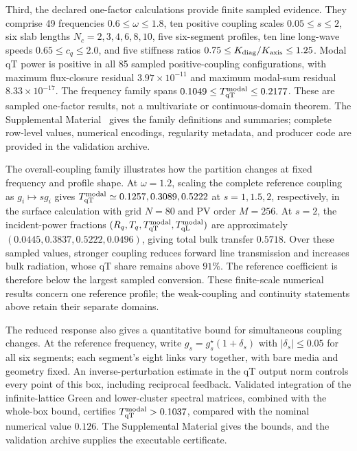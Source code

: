 \documentclass[10pt,aps,pre,reprint,floatfix,notitlepage,nofootinbib]{revtex4-2}
\newcommand{\qT}{\mathrm{qT}}
\newcommand{\qL}{\mathrm{qL}}
\begin{document}
Third, the declared one-factor calculations provide finite sampled evidence. They comprise 49 frequencies $0.6\leq\omega\leq1.8$, ten positive coupling scales $0.05\leq s\leq2$, six slab lengths $N_c=2,3,4,6,8,10$, five six-segment profiles, ten line long-wave speeds $0.65\leq c_q\leq2.0$, and five stiffness ratios $0.75\leq K_{\rm diag}/K_{\rm axis}\leq1.25$. Modal qT power is positive in all 85 sampled positive-coupling configurations, with maximum flux-closure residual $3.97\times10^{-11}$ and maximum modal-sum residual $8.33\times10^{-17}$. The frequency family spans $0.1049\leq T_{\qT}^{\rm modal}\leq0.2177$. These are sampled one-factor results, not a multivariate or continuous-domain theorem. The Supplemental Material~\cite{SupplementalMaterial} gives the family definitions and summaries; complete row-level values, numerical encodings, regularity metadata, and producer code are provided in the validation archive.

The overall-coupling family illustrates how the partition changes at fixed frequency and profile shape. At $\omega=1.2$, scaling the complete reference coupling as $g_i\mapsto s g_i$ gives $T_{\qT}^{\rm modal}\simeq0.1257,0.3089,0.5222$ at $s=1,1.5,2$, respectively, in the surface calculation with grid $N=80$ and PV order $M=256$. At $s=2$, the incident-power fractions $(R_q,T_q,T_{\qT}^{\rm modal},T_{\qL}^{\rm modal})$ are approximately $(0.0445,0.3837,0.5222,0.0496)$, giving total bulk transfer $0.5718$. Over these sampled values, stronger coupling reduces forward line transmission and increases bulk radiation, whose qT share remains above $91\%$. The reference coefficient is therefore below the largest sampled conversion. These finite-scale numerical results concern one reference profile; the weak-coupling and continuity statements above retain their separate domains.

The reduced response also gives a quantitative bound for simultaneous coupling changes. At the reference frequency, write $g_s=g_s^\star(1+\delta_s)$ with $|\delta_s|\leq0.05$ for all six segments; each segment's eight links vary together, with bare media and geometry fixed. An inverse-perturbation estimate in the qT output norm controls every point of this box, including reciprocal feedback. Validated integration of the infinite-lattice Green and lower-cluster spectral matrices, combined with the whole-box bound, certifies $T_{\qT}^{\rm modal}>0.1037$, compared with the nominal numerical value $0.126$. The Supplemental Material gives the bounds, and the validation archive supplies the executable certificate.
\end{document}
